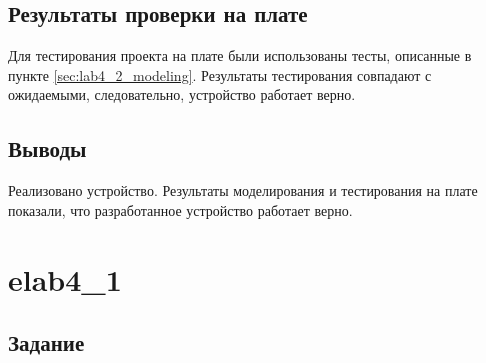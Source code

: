 \subsection{Результаты проверки на плате}

Для тестирования проекта на плате были использованы тесты, описанные в пункте \ref{sec:lab4_2_modeling}. Результаты тестирования совпадают с ожидаемыми, следовательно, устройство работает верно.

\subsection{Выводы}

Реализовано устройство. Результаты моделирования и тестирования на плате показали, что разработанное устройство работает верно.

\newpage

\section{elab4\_1}

\subsection{Задание}


